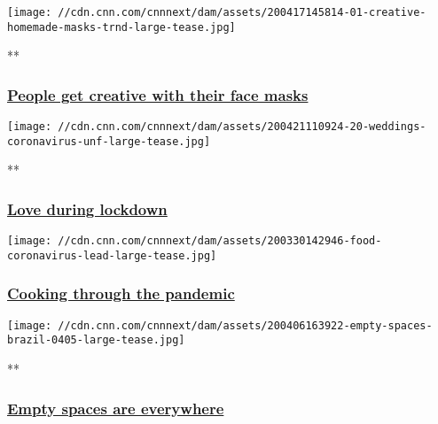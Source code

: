 \href{/2020/04/17/world/gallery/creative-face-masks-trnd/index.html}{}

\texttt{[image: //cdn.cnn.com/cnnnext/dam/assets/200417145814-01-creative-homemade-masks-trnd-large-tease.jpg]}

**

\hypertarget{people-get-creative-with-their-face-masks}{%
\subsubsection{\texorpdfstring{\href{/2020/04/17/world/gallery/creative-face-masks-trnd/index.html}{People
get creative with their face
masks}}{People get creative with their face masks}}\label{people-get-creative-with-their-face-masks}}

\href{/2020/04/21/world/gallery/love-during-lockdown/index.html}{}

\texttt{[image: //cdn.cnn.com/cnnnext/dam/assets/200421110924-20-weddings-coronavirus-unf-large-tease.jpg]}

**

\hypertarget{love-during-lockdown}{%
\subsubsection{\texorpdfstring{\href{/2020/04/21/world/gallery/love-during-lockdown/index.html}{Love
during lockdown}}{Love during lockdown}}\label{love-during-lockdown}}

\href{/2020/03/31/health/coronavirus-cooking/index.html}{}

\texttt{[image: //cdn.cnn.com/cnnnext/dam/assets/200330142946-food-coronavirus-lead-large-tease.jpg]}

\hypertarget{cooking-through-the-pandemic}{%
\subsubsection{\texorpdfstring{\href{/2020/03/31/health/coronavirus-cooking/index.html}{Cooking
through the
pandemic}}{Cooking through the pandemic}}\label{cooking-through-the-pandemic}}

\href{/2020/03/12/world/gallery/coronavirus-empty-spaces/index.html}{}

\texttt{[image: //cdn.cnn.com/cnnnext/dam/assets/200406163922-empty-spaces-brazil-0405-large-tease.jpg]}

**

\hypertarget{empty-spaces-are-everywhere}{%
\subsubsection{\texorpdfstring{\href{/2020/03/12/world/gallery/coronavirus-empty-spaces/index.html}{Empty
spaces are
everywhere}}{Empty spaces are everywhere}}\label{empty-spaces-are-everywhere}}

